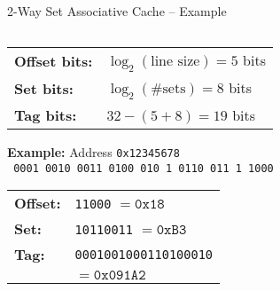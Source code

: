 \documentclass[aspectratio=169,12pt]{beamer}
\begin{document}
\begin{frame}{2-Way Set Associative Cache -- Example}
\begin{columns}[T]
\begin{column}{0.48\textwidth}
\vspace{0.2cm}
\begin{tabular}{ll}
\textcolor{offsetcolor}{\textbf{Offset bits:}} & $\log_2(\text{line size}) = 5$ bits\\
\textcolor{setcolor}{\textbf{Set bits:}} & $\log_2(\text{\#sets}) = 8$ bits\\
\textcolor{tagcolor}{\textbf{Tag bits:}} & $32 - (5+8) = 19$ bits\\
\end{tabular}

\vspace{0.3cm}
\textbf{Example:} Address \texttt{0x12345678}\\[2pt]
{\texttt{%
\textcolor{tagcolor}{0001 0010 0011 0100 010}%
\textcolor{setcolor}{1 0110 011}%
\textcolor{offsetcolor}{1 1000}}}\\[4pt]

\footnotesize
\begin{tabular}{ll}
\textcolor{offsetcolor}{\textbf{Offset:}} & \texttt{11000} $= \mathtt{0x18}$\\
\textcolor{setcolor}{\textbf{Set:}} & \texttt{10110011} $= \mathtt{0xB3}$\\
\textcolor{tagcolor}{\textbf{Tag:}} & \texttt{0001001000110100010}\\
                     & $= \mathtt{0x091A2}$\\
\end{tabular}
\end{column}
\end{columns}
\end{frame}
\end{document}
